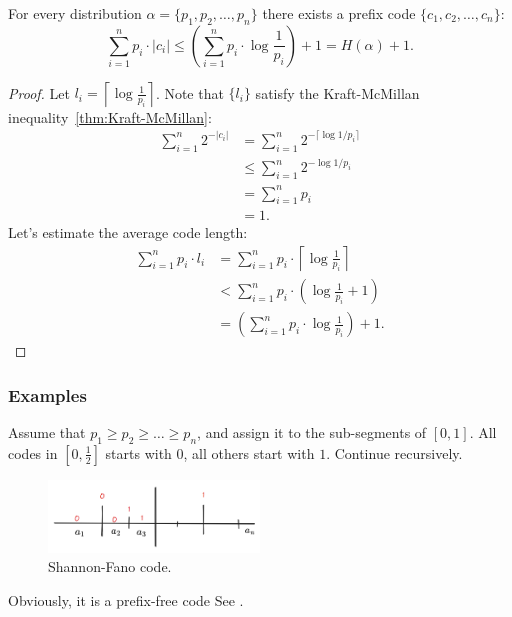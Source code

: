 \begin{theorem}[Shannon]
    For every distribution $\alpha = \{ p_{1}, p_{2}, \dots, p_{n} \}$ there exists a prefix code $\{ c_{1}, c_{2}, \dots, c_{n} \}$:
    \[
        \sum _{ i = 1 }^{ n } p_{i} \cdot |c_{i}| \le \left(\sum _{ i = 1 }^{ n } p_{i} \cdot \log \frac{1}{p_{i}}\right) + 1 = H(\alpha) + 1.
    \]
\end{theorem}
\begin{proof}
    Let $l_{i} = \left\lceil  \log \frac{1}{p_{i}}  \right\rceil$.
    Note that $\{ l_{i} \}$ satisfy the Kraft-McMillan inequality~\ref{thm:Kraft-McMillan}:
    \begin{align*}
        \sum _{ i = 1 }^{ n } 2^{-|c_{i}|} &= \sum _{ i = 1 }^{ n } 2^{-\lceil \log 1/p_{i} \rceil }  \\
        &\le \sum _{ i = 1 }^{ n } 2^{-\log 1/p_{i}} \\
        &= \sum_{i =1}^{n} p_{i} \\
        &= 1.
    \end{align*}
    Let's estimate the average code length:
    \begin{align*}
        \sum _{ i = 1 }^{ n } p_{i} \cdot l_i &= \sum _{ i = 1 }^{ n } p_{i} \cdot \left\lceil  \log \frac{1}{p_{i}}  \right\rceil  \\
        &< \sum _{ i = 1 }^{ n } p_{i} \cdot \left( \log \frac{1}{p_{i}} + 1 \right) \\
        &= \left( \sum_{i = 1}^{n}p_{i} \cdot \log \frac{1}{p_{i}} \right) + 1.
    \end{align*}
\end{proof}

\subsubsection{Examples}

\begin{example}
    Assume that $p_{1} \ge p_{2} \ge \dots \ge p_{n}$, and assign it to the sub-segments of $[0, 1]$.
    All codes in $\left[ 0, \frac{1}{2} \right]$ starts with $0$, all others start with $1$. Continue recursively.
    \begin{figure}[H]
        \centering
        \includegraphics[width=0.5\textwidth]{figures/telegram-cloud-document-2-5244613392966114247}
        \caption{Shannon-Fano code.}
        \label{fig:telegram-cloud-document-2-5244613392966114247}
    \end{figure}
    Obviously, it is a prefix-free code
    See .
\end{example}

